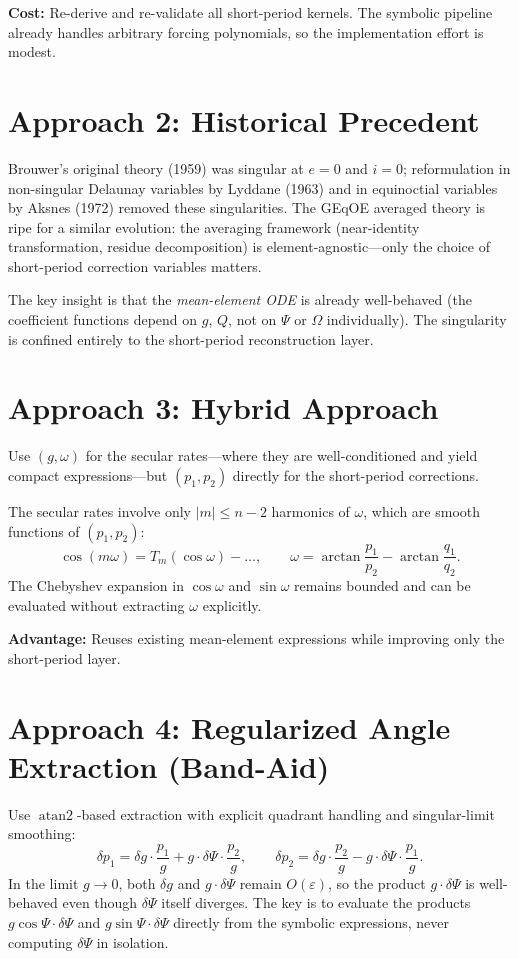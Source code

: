 \documentclass[11pt]{article}
\begin{document}
\textbf{Cost:} Re-derive and re-validate all short-period kernels. The
symbolic pipeline already handles arbitrary forcing polynomials, so the
implementation effort is modest.

\section{Approach 2: Historical Precedent}

Brouwer's original theory (1959) was singular at $e = 0$ and $i = 0$;
reformulation in non-singular Delaunay variables by Lyddane (1963) and
in equinoctial variables by Aksnes (1972) removed these singularities.
The GEqOE averaged theory is ripe for a similar evolution: the averaging
framework (near-identity transformation, residue decomposition) is
element-agnostic---only the choice of short-period correction variables
matters.

The key insight is that the \emph{mean-element ODE} is already well-behaved
(the coefficient functions depend on $g$, $Q$, not on $\Psi$ or $\Omega$
individually). The singularity is confined entirely to the short-period
reconstruction layer.

\section{Approach 3: Hybrid Approach}

Use $(g, \omega)$ for the secular rates---where they are well-conditioned
and yield compact expressions---but $(p_1, p_2)$ directly for the
short-period corrections.

The secular rates involve only $|m| \le n-2$ harmonics of $\omega$,
which are smooth functions of $(p_1, p_2)$:
\[
\cos(m\omega) = T_m(\cos\omega) - \ldots, \qquad
\omega = \arctan\frac{p_1}{p_2} - \arctan\frac{q_1}{q_2}.
\]
The Chebyshev expansion in $\cos\omega$ and $\sin\omega$ remains bounded
and can be evaluated without extracting $\omega$ explicitly.

\textbf{Advantage:} Reuses existing mean-element expressions while
improving only the short-period layer.

\section{Approach 4: Regularized Angle Extraction (Band-Aid)}

Use $\operatorname{atan2}$-based extraction with explicit quadrant handling
and singular-limit smoothing:
\[
\delta p_1 = \delta g \cdot \frac{p_1}{g} + g \cdot \delta\Psi \cdot \frac{p_2}{g},
\qquad
\delta p_2 = \delta g \cdot \frac{p_2}{g} - g \cdot \delta\Psi \cdot \frac{p_1}{g}.
\]
In the limit $g \to 0$, both $\delta g$ and $g \cdot \delta\Psi$ remain
$O(\varepsilon)$, so the product $g \cdot \delta\Psi$ is well-behaved even
though $\delta\Psi$ itself diverges. The key is to evaluate the products
$g\cos\Psi \cdot \delta\Psi$ and $g\sin\Psi \cdot \delta\Psi$ directly
from the symbolic expressions, never computing $\delta\Psi$ in isolation.
\end{document}
